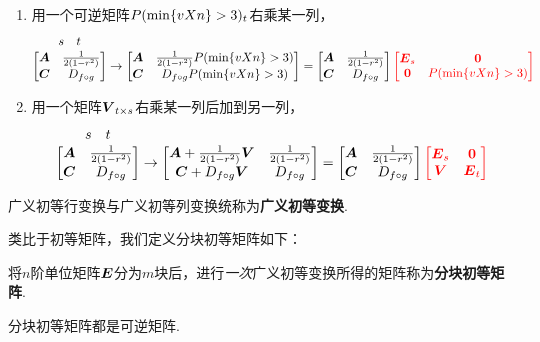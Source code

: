 \begin{definition}
\begin{enumerate}
\item 用一个可逆矩阵\(\P_t\)右乘某一列，\[
\originalmatrixHead \to \begin{bmatrix}
\A & \B \P \\
\C & \D \P
\end{bmatrix} = \originalmatrix \r{\begin{bmatrix}
\E_s & \z \\
\z & \P
\end{bmatrix}}
\]

\item 用一个矩阵\(\Q_{t \times s}\)右乘某一列后加到另一列，\[
\originalmatrixHead \to \begin{bmatrix}
\A + \B \Q & \B \\
\C + \D \Q & \D
\end{bmatrix} = \originalmatrix \r{\begin{bmatrix}
\E_s & \z \\
\Q & \E_t
\end{bmatrix}}
\]
\end{enumerate}

广义初等行变换与广义初等列变换统称为\textbf{广义初等变换}.
\end{definition}

类比于初等矩阵，我们定义分块初等矩阵如下：
\begin{definition}
将\(n\)阶单位矩阵\(\E\)分为\(m\)块后，进行\emph{一次}广义初等变换所得的矩阵称为\textbf{分块初等矩阵}.
\end{definition}

\begin{property}
分块初等矩阵都是可逆矩阵.
\end{property}

